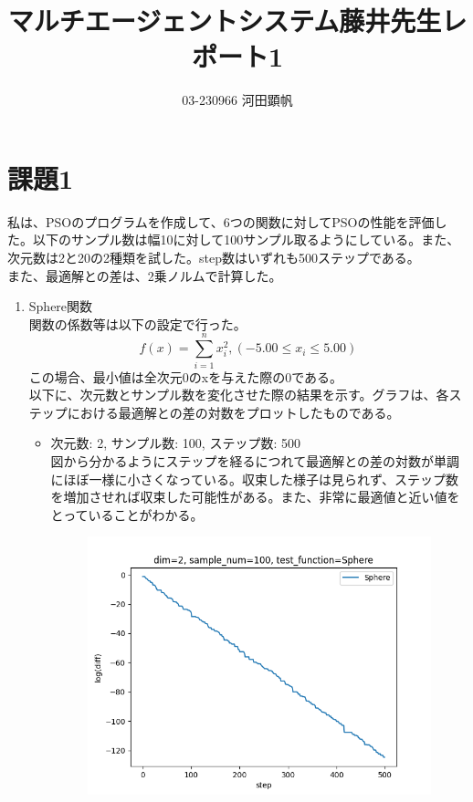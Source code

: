 \documentclass{jsarticle}
\begin{document}
\title{マルチエージェントシステム藤井先生レポート1}
\author{03-230966 河田顕帆}
\maketitle
\section{課題1}
私は、PSOのプログラムを作成して、6つの関数に対してPSOの性能を評価した。以下のサンプル数は幅10に対して100サンプル取るようにしている。また、次元数は2と20の2種類を試した。step数はいずれも500ステップである。\\
また、最適解との差は、2乗ノルムで計算した。\\
\begin{enumerate}
    \item Sphere関数 \\
        関数の係数等は以下の設定で行った。
        \begin{equation}
            f(x) = \sum_{i=1}^{n} x_i^2,  (-5.00 \leq x_i \leq 5.00)
        \end{equation}
        この場合、最小値は全次元0のxを与えた際の0である。\\
        以下に、次元数とサンプル数を変化させた際の結果を示す。グラフは、各ステップにおける最適解との差の対数をプロットしたものである。
        \begin {itemize}
            \item 次元数: 2, サンプル数: 100, ステップ数: 500 \\
                図から分かるようにステップを経るにつれて最適解との差の対数が単調にほぼ一様に小さくなっている。収束した様子は見られず、ステップ数を増加させれば収束した可能性がある。また、非常に最適値と近い値をとっていることがわかる。\\
                \begin{figure}[H]
                \includegraphics [width=10cm] {./result/Sphere_N_2.png}

\end{figure}
\end{itemize}
\end{enumerate}
\end{document}

